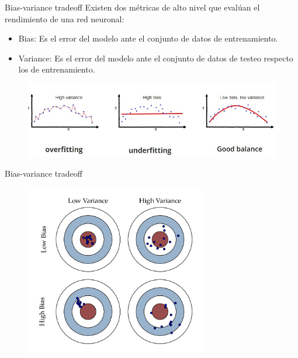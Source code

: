\begin{frame}{Bias-variance tradeoff}
Existen dos \alert{métricas} de alto nivel que evalúan el rendimiento de una red neuronal:
\begin{itemize}
    \item \alert{Bias}: Es el error del modelo ante el conjunto de datos de \alert{entrenamiento}.
    \item \alert{Variance}: Es el error del modelo ante el conjunto de datos de \alert{testeo} respecto los de entrenamiento. 
\end{itemize}

\begin{figure}
\centering
    \includegraphics[width=\textwidth]{Slides/figures/Tema 3/BiasVariance_1.jpg}
    \caption{\cite{BiasVariance_1}}
\end{figure}
\end{frame}

\begin{frame}{Bias-variance tradeoff}
\begin{figure}
\centering
    \includegraphics[width=0.7\textwidth]{Slides/figures/Tema 3/BiasVariance.png}
    \caption{\cite{BiasVariance}}
\end{figure}
\end{frame}

